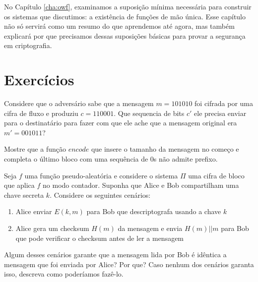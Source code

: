 No Capítulo \ref{cha:owf}, examinamos a suposição mínima necessária para construir os sistemas que discutimos: a existência de funções de mão única.
Esse capítulo não só servirá como um resumo do que aprendemos até agora, mas também explicará por que precisamos dessas suposições básicas para provar a segurança em criptografia.

\section{Exercícios}
\label{sec:exercicios}


\begin{exercicio}
  Considere que o adversário sabe que a mensagem $m = 101010$ foi cifrada por uma cifra de fluxo e produziu $c = 110001$.
  Que sequencia de bits $c'$ ele precisa enviar para o destinatário para fazer com que ele ache que a mensagem original era $m' = 001011$?
\end{exercicio}


\begin{exercicio}
  Mostre que a função $encode$ que insere o tamanho da mensagem no começo e completa o último bloco com uma sequência de $0$s não admite prefixo.
\end{exercicio}

\begin{exercicio}
  Seja $f$ uma função pseudo-aleatória e considere o sistema $\Pi$ uma cifra de bloco que aplica $f$ no modo contador.
  Suponha que Alice e Bob compartilham uma chave secreta $k$.
  Considere os seguintes cenários:
  \begin{enumerate}
  \item Alice enviar $E(k, m)$ para Bob que descriptografa usando a chave $k$
  \item Alice gera um checksum $H(m)$ da mensagem e envia $H(m)||m$ para Bob que pode verificar o checksum antes de ler a mensagem
  \end{enumerate}
  Algum desses cenários garante que a mensagem lida por Bob é idêntica a mensagem que foi enviada por Alice? Por que? Caso nenhum dos cenários garanta isso, descreva como poderíamos fazê-lo.
\end{exercicio}
